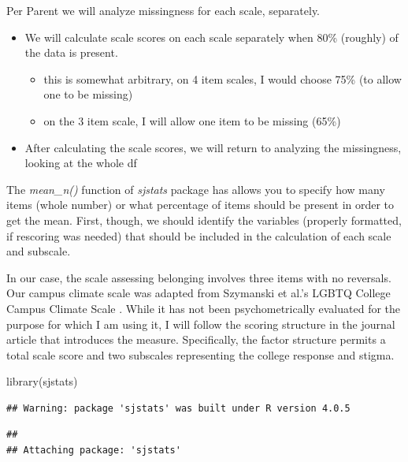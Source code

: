 \documentclass[
  english,
]{book}
\newenvironment{Shaded}{\begin{snugshade}}{\end{snugshade}}
\newcommand{\FunctionTok}[1]{\textcolor[rgb]{0.00,0.00,0.00}{#1}}
\newcommand{\NormalTok}[1]{#1}
\providecommand{\tightlist}{%
  \setlength{\itemsep}{0pt}\setlength{\parskip}{0pt}}
\begin{document}
Per Parent \citeyearpar{parent_handling_2013} we will analyze missingness for each scale, separately.

\begin{itemize}
\tightlist
\item
  We will calculate scale scores on each scale separately when 80\% (roughly) of the data is present.

  \begin{itemize}
  \tightlist
  \item
    this is somewhat arbitrary, on 4 item scales, I would choose 75\% (to allow one to be missing)
  \item
    on the 3 item scale, I will allow one item to be missing (65\%)
  \end{itemize}
\item
  After calculating the scale scores, we will return to analyzing the missingness, looking at the whole df
\end{itemize}

The \emph{mean\_n()} function of \emph{sjstats} package has allows you to specify how many items (whole number) or what percentage of items should be present in order to get the mean. First, though, we should identify the variables (properly formatted, if rescoring was needed) that should be included in the calculation of each scale and subscale.

In our case, the scale assessing belonging \citep{bollen_perceived_1990, hurtado_effects_1997} involves three items with no reversals. Our campus climate scale was adapted from Szymanski et al.'s LGBTQ College Campus Climate Scale \citep{szymanski_perceptions_2020}. While it has not been psychometrically evaluated for the purpose for which I am using it, I will follow the scoring structure in the journal article that introduces the measure. Specifically, the factor structure permits a total scale score and two subscales representing the college response and stigma.

\begin{Shaded}
\begin{Highlighting}[]
\FunctionTok{library}\NormalTok{(sjstats)}
\end{Highlighting}
\end{Shaded}

\begin{verbatim}
## Warning: package 'sjstats' was built under R version 4.0.5
\end{verbatim}

\begin{verbatim}
## 
## Attaching package: 'sjstats'
\end{verbatim}
\end{document}

